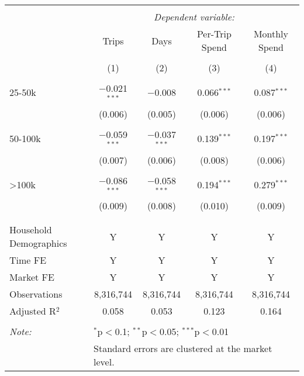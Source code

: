 
\begin{table}[!htbp] \centering
  \caption{}
  \label{tab:aggSpend}
\begin{tabular}{@{\extracolsep{5pt}}lcccc}
\\[-1.8ex]\hline
\hline \\[-1.8ex]
 & \multicolumn{4}{c}{\textit{Dependent variable:}} \\
\cline{2-5}
 & Trips & Days & Per-Trip Spend & Monthly Spend \\
\\[-1.8ex] & (1) & (2) & (3) & (4)\\
\hline \\[-1.8ex]
 25-50k & $-$0.021$^{***}$ & $-$0.008 & 0.066$^{***}$ & 0.087$^{***}$ \\
  & (0.006) & (0.005) & (0.006) & (0.006) \\
  & & & & \\
 50-100k & $-$0.059$^{***}$ & $-$0.037$^{***}$ & 0.139$^{***}$ & 0.197$^{***}$ \\
  & (0.007) & (0.006) & (0.008) & (0.006) \\
  & & & & \\
 >100k & $-$0.086$^{***}$ & $-$0.058$^{***}$ & 0.194$^{***}$ & 0.279$^{***}$ \\
  & (0.009) & (0.008) & (0.010) & (0.009) \\
  & & & & \\
\hline \\[-1.8ex]
Household Demographics & Y & Y & Y & Y \\
Time FE & Y & Y & Y & Y \\
Market FE & Y & Y & Y & Y \\
Observations & 8,316,744 & 8,316,744 & 8,316,744 & 8,316,744 \\
Adjusted R$^{2}$ & 0.058 & 0.053 & 0.123 & 0.164 \\
\hline
\hline \\[-1.8ex]
\textit{Note:}  & \multicolumn{4}{l}{$^{*}$p$<$0.1; $^{**}$p$<$0.05; $^{***}$p$<$0.01} \\
 & \multicolumn{4}{l}{Standard errors are clustered at the market level.} \\
\end{tabular}
\end{table}
